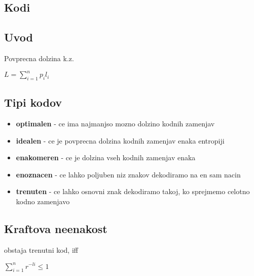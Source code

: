 \documentclass{article}
\begin{document}
\begin{multicols}{4}
\section{Kodi}

\subsection{Uvod}
Povprecna dolzina k.z.
\begin{center}
    \begin{math}
        L = \sum_{i=1}^n p_i l_i
    \end{math}
\end{center}

\subsection{Tipi kodov}
\begin{itemize}
    \item \textbf{optimalen} - ce ima najmanjso mozno dolzino kodnih zamenjav
    \item \textbf{idealen} - ce je povprecna dolzina kodnih zamenjav enaka entropiji
    \item \textbf{enakomeren} - ce je dolzina vseh kodnih zamenjav enaka
    \item \textbf{enoznacen} - ce lahko poljuben niz znakov dekodiramo na en sam nacin
    \item \textbf{trenuten} - ce lahko osnovni znak dekodiramo takoj, ko sprejmemo celotno kodno zamenjavo
\end{itemize}

\subsection{Kraftova neenakost}
obstaja trenutni kod, iff
\begin{center}
    \begin{math}
        \sum_{i=1}^n r^{-li} \leq 1
    \end{math}
\end{center}


\end{multicols}
\end{document}
